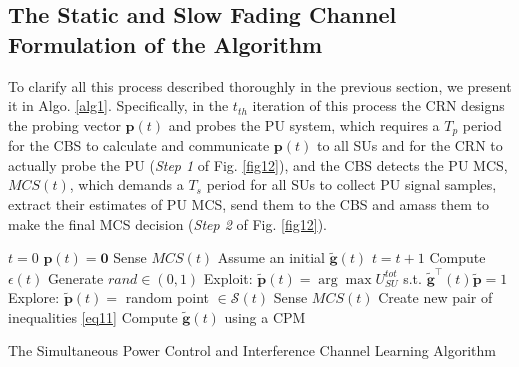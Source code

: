\documentclass[journal]{IEEEtran}
\begin{document}
\subsection{The Static and Slow Fading Channel Formulation of the Algorithm}

To clarify all this process described thoroughly in the previous section, we present it in Algo. \ref{alg1}. Specifically, in the $t_{th}$ iteration of this process the CRN designs the probing vector $\mathbf{p}(t)$ and probes the PU system, which requires a $T_{p}$ period for the CBS to calculate and communicate $\mathbf{p}(t)$ to all SUs and for the CRN to actually probe the PU (\textit{Step 1} of Fig. \ref{fig12}), and the CBS detects the PU MCS, $MCS(t)$, which demands a $T_{s}$ period for all SUs to collect PU signal samples, extract their estimates of PU MCS, send them to the CBS and amass them to make the final MCS decision (\textit{Step 2} of Fig. \ref{fig12}).

\begin{algorithm}
\begin{algorithmic}
\STATE $t=0$
\STATE $\mathbf{p}(t)=\mathbf{0}$
\STATE Sense $MCS(t)$
\STATE Assume an initial $\mathbf{\tilde{g}}(t)$
\LOOP
\STATE $t=t+1$
\STATE Compute $\epsilon(t)$
\STATE Generate $rand \in (0,1)$ 
\STATE Exploit: $\mathbf{\tilde{p}}(t)=\arg\max U_{SU}^{tot}$ s.t. $\mathbf{\tilde{g}^\intercal}(t)\mathbf{\tilde{p}}=1$
\ELSE
\STATE Explore: $\mathbf{\tilde{p}}(t)=$ random point $\in \mathcal{S}(t)$
\ENDIF
\STATE Sense $MCS(t)$
\STATE Create new pair of inequalities \eqref{eq11}
\STATE Compute $\mathbf{\tilde{g}}(t)$ using a CPM
\ENDLOOP
\end{algorithmic}
\caption{The Simultaneous Power Control and Interference Channel Learning Algorithm}\label{GA}
\label{alg1}
\end{algorithm}
\end{document}
